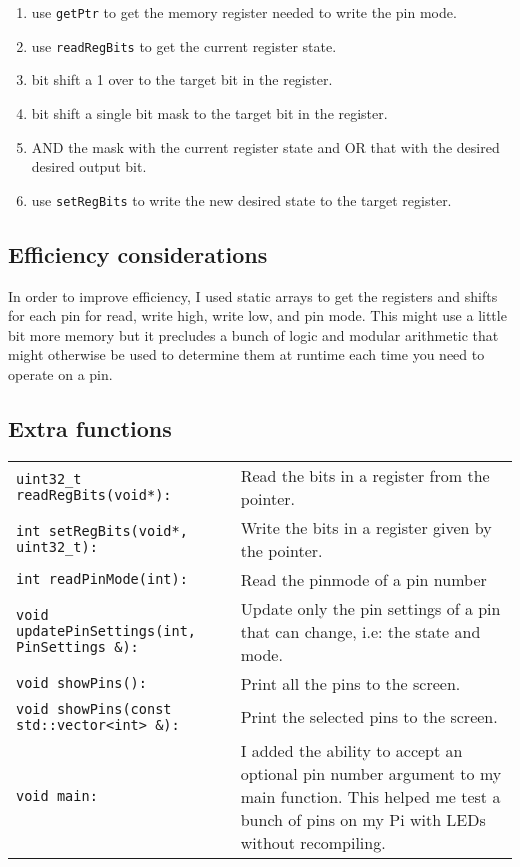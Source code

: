 \documentclass{article}
\begin{document}
\begin{itemize}
		\begin{enumerate}
			\item use \texttt{getPtr} to get the memory register needed to write the pin mode.
			\item use \texttt{readRegBits} to get the current register state.
			\item bit shift a 1 over to the target bit in the register. 
			\item bit shift a single bit mask to the target bit in the register.
			\item AND the mask with the current register state and OR that with the desired desired output bit.
			\item use \texttt{setRegBits} to write the new desired state to the target register. 
		\end{enumerate}
\end{itemize}

\subsection{Efficiency considerations}
In order to improve efficiency, I used static arrays to get the registers and shifts for each pin for read, write high, write low, and pin mode. This might use a little bit more memory but it precludes a bunch of logic and modular arithmetic that might otherwise be used to determine them at runtime each time you need to operate on a pin. 

\subsection{Extra functions}%
\begin{tabularx}{\linewidth}{lX}
	\texttt{uint32_t readRegBits(void*):}
	& Read the bits in a register from the pointer.\\[1em]
	\texttt{int setRegBits(void*, uint32_t):}
	& Write the bits in a register given by the pointer.\\[1em]
	\texttt{int readPinMode(int):}
	& Read the pinmode of a pin number\\[1em]
	\texttt{void updatePinSettings(int, PinSettings \&):}
	& Update only the pin settings of a pin that can change, i.e: the state and mode.\\[2em]
	\texttt{void showPins():}
	& Print all the pins to the screen.\\[1em]
	\texttt{void showPins(const std::vector<int> \&):}
	& Print the selected pins to the screen.\\[1em]
	\texttt{void main:}
	& I added the ability to accept an optional pin number argument to my main function. This helped me test a bunch of pins on my Pi with LEDs without recompiling.\\[1em]
\end{tabularx}
\end{document}
